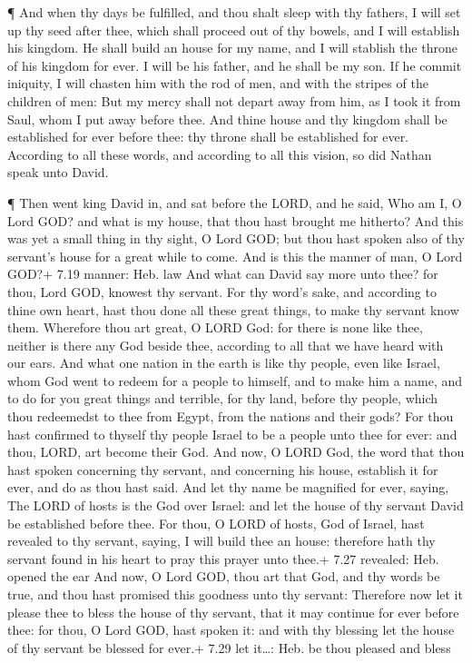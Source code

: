 ¶ And when thy days be fulfilled, and thou shalt sleep
with thy fathers, I will set up thy seed after thee, which shall proceed
out of thy bowels, and I will establish his kingdom.  He
shall build an house for my name, and I will stablish the throne of his
kingdom for ever.  I will be his father, and he shall be my
son. If he commit iniquity, I will chasten him with the rod of men, and
with the stripes of the children of men:  But my mercy
shall not depart away from him, as I took it from Saul, whom I put away
before thee.  And thine house and thy kingdom shall be
established for ever before thee: thy throne shall be established for
ever.  According to all these words, and according to all
this vision, so did Nathan speak unto David.

 ¶ Then went king David in, and sat before the LORD, and he
said, Who am I, O Lord GOD? and what is my house, that thou hast brought
me hitherto?  And this was yet a small thing in thy sight,
O Lord GOD; but thou hast spoken also of thy servant's house for a great
while to come. And is this the manner of man, O Lord GOD?+ 7.19 manner:
Heb. law  And what can David say more unto thee? for thou,
Lord GOD, knowest thy servant.  For thy word's sake, and
according to thine own heart, hast thou done all these great things, to
make thy servant know them.  Wherefore thou art great, O
LORD God: for there is none like thee, neither is there any God beside
thee, according to all that we have heard with our ears. 
And what one nation in the earth is like thy people, even like Israel,
whom God went to redeem for a people to himself, and to make him a name,
and to do for you great things and terrible, for thy land, before thy
people, which thou redeemedst to thee from Egypt, from the nations and
their gods?  For thou hast confirmed to thyself thy people
Israel to be a people unto thee for ever: and thou, LORD, art become
their God.  And now, O LORD God, the word that thou hast
spoken concerning thy servant, and concerning his house, establish it
for ever, and do as thou hast said.  And let thy name be
magnified for ever, saying, The LORD of hosts is the God over Israel:
and let the house of thy servant David be established before thee.
 For thou, O LORD of hosts, God of Israel, hast revealed to
thy servant, saying, I will build thee an house: therefore hath thy
servant found in his heart to pray this prayer unto thee.+ 7.27
revealed: Heb. opened the ear  And now, O Lord GOD, thou
art that God, and thy words be true, and thou hast promised this
goodness unto thy servant:  Therefore now let it please
thee to bless the house of thy servant, that it may continue for ever
before thee: for thou, O Lord GOD, hast spoken it: and with thy blessing
let the house of thy servant be blessed for ever.+ 7.29 let it\ldots:
Heb. be thou pleased and bless

